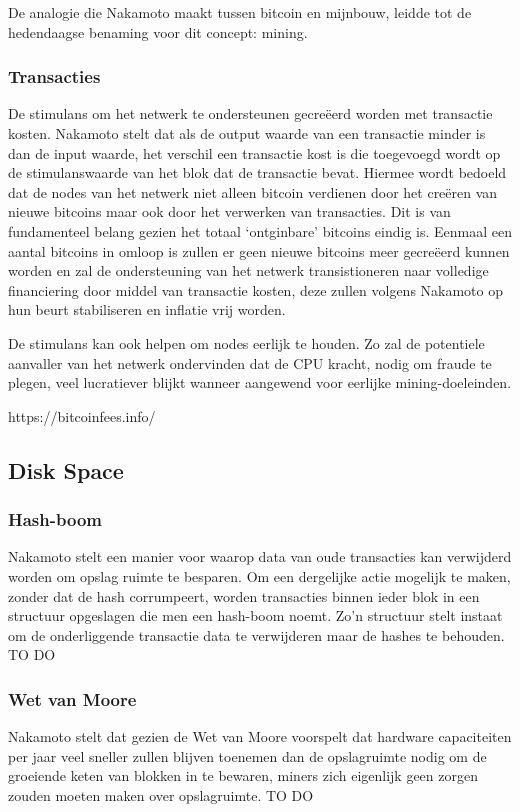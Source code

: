 		De analogie die Nakamoto maakt tussen bitcoin en mijnbouw, leidde tot de hedendaagse benaming voor dit concept: mining. 
		
		\subsubsection{Transacties}
		De stimulans om het netwerk te ondersteunen gecreëerd worden met transactie kosten. Nakamoto stelt dat als de output waarde van een transactie minder is dan de input waarde, het verschil een transactie kost is die toegevoegd wordt op de stimulanswaarde van het blok dat de transactie bevat. Hiermee wordt bedoeld dat de nodes van het netwerk niet alleen bitcoin verdienen door het creëren van nieuwe bitcoins maar ook door het verwerken van transacties. Dit is van fundamenteel belang gezien het totaal ‘ontginbare’ bitcoins eindig is. Eenmaal een aantal bitcoins in omloop is zullen er geen nieuwe bitcoins meer gecreëerd kunnen worden en zal de ondersteuning van het netwerk transistioneren naar volledige financiering door middel van transactie kosten, deze zullen volgens Nakamoto op hun beurt stabiliseren en inflatie vrij worden.
		
		De stimulans kan ook helpen om nodes eerlijk te houden. Zo zal de potentiele aanvaller van het netwerk ondervinden dat de CPU kracht, nodig om fraude te plegen, veel lucratiever blijkt wanneer aangewend voor eerlijke mining-doeleinden. 
		
		https://bitcoinfees.info/
		
	\subsection{Disk Space}
		\subsubsection{Hash-boom}
		Nakamoto stelt  een manier voor waarop data van oude transacties kan verwijderd worden om opslag ruimte te besparen. Om een dergelijke actie mogelijk te maken, zonder dat de hash corrumpeert, worden transacties binnen ieder blok in een structuur opgeslagen die men een hash-boom noemt. Zo’n structuur stelt instaat om de onderliggende transactie data te verwijderen maar de hashes te behouden. TO DO
		\subsubsection{Wet van Moore}	
		Nakamoto stelt  dat gezien de Wet van Moore voorspelt dat hardware capaciteiten per jaar veel sneller zullen blijven toenemen dan de opslagruimte nodig om de groeiende keten van blokken in te bewaren, miners zich eigenlijk geen zorgen zouden moeten maken over opslagruimte. TO DO
